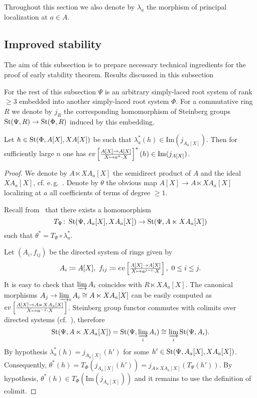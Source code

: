 \usepackage{mathtools}Throughout this section we also denote by $\lambda_a$ the morphism of principal localization at $a \in A$.
\subsection{Improved stability}
The aim of this subsection is to prepare necessary technical ingredients for the proof of early stability theorem.
Results discussed in this subsection

For the rest of this subsection $\Psi$ is an arbitrary simply-laced root system of rank $\geq 3$ embedded into another simply-laced root system $\Phi$.
For a commutative ring $R$ we denote by $j_R$ the corresponding homomorphism of Steinberg groups $\operatorname{St}(\Psi, R) \to \operatorname{St}(\Phi, R)$ induced by this embedding.

\begin{lemma}\label{lem:dp-2}
Let $h\in\operatorname{St}(\Phi, A[X], X A[X])$ be such that $\lambda_a^*(h) \in \mathrm{Im}(j_{A_a[X]})$.
Then for sufficiently large $n$ one has $ev \textstyle \left[\frac{A[X] \rightarrow A[X]}{X \mapsto a^n\cdot X}\right]^*(h) \in \mathrm{Im}(j_{A[X]})$. \end{lemma}
\begin{proof}
 We denote by $A\ltimes XA_a[X]$ the semidirect product of $A$ and the ideal $XA_a[X]$, cf. e.\,g.~\cite[Definition~3.2]{S15}.
 Denote by $\theta$ the obvious map $A[X]\rightarrow A\ltimes XA_a[X]$ localizing at $a$ all coefficients of terms of degree $\geq 1$.

 Recall from~\cite[\S~2]{LS17} that there exists a homomorphism
 \[T_\Psi \colon \operatorname{St}(\Psi, A_a[X], XA_a[X]) \to \operatorname{St}(\Psi, A \ltimes XA_a[X])\]
 such that $\theta^* = T_\Psi \circ \lambda_a^*$.

 Let $(A_i, f_{ij})$ be the directed system of rings given by
 \[A_i\coloneqq A[X],\ f_{ij} \coloneqq ev \textstyle \left[\frac{A[X] \rightarrow A[X]}{X \mapsto a^{j-i} \cdot X}\right],\ 0 \leq i\leq j.\]
 It is easy to check that $\varinjlim A_i$ coincides with $R \ltimes XA_a[X]$.
 The canonical morphisms $A_j\rightarrow \varinjlim_i A_i \cong A\ltimes XA_a[X]$ can be easily computed as $ev \textstyle \left[\frac{A[X] \rightarrow A\ltimes XA_a[X]}{X \mapsto a^{-j} \cdot X}\right]$.
 Steinberg group functor commutes with colimits over directed systems (cf.~\cite[Lemma~2.2]{Tu83}), therefore
 \[\operatorname{St}(\Psi, A\ltimes XA_a[X]) = \operatorname{St}(\Psi, \varinjlim_i A_i) \cong \varinjlim_i \operatorname{St}(\Psi,A_i).\]
 By hypothesis $\lambda_a^*(h) = j_{A_a[X]}(h')$ for some $h' \in \operatorname{St}(\Psi, A_a[X], XA_a[X])$.
 Consequently, $\theta^*(h) = T_\Phi(j_{A_a[X]}(h')) = j_{A \ltimes XA_a[X]}(T_\Psi(h'))$.
 By hypothesis, $\theta^*(h) \in T_\Phi(\mathrm{Im}(j_{A_a[X]}))$ and it remains to use the definition of colimit.
\end{proof}

